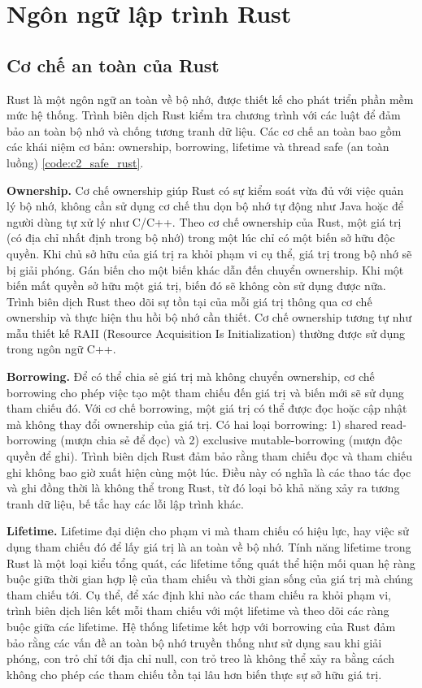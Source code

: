 \section{Ngôn ngữ lập trình Rust}

\subsection{Cơ chế an toàn của Rust}

Rust là một ngôn ngữ an toàn về bộ nhớ, được thiết kế cho phát triển phần mềm mức hệ thống.
Trình biên dịch Rust kiểm tra chương trình với các luật để đảm bảo an toàn bộ nhớ và chống tương tranh dữ liệu.
Các cơ chế an toàn bao gồm các khái niệm cơ bản: ownership, borrowing, lifetime và thread safe (an toàn luồng) \ref{code:c2_safe_rust}.

\textbf{Ownership.} Cơ chế ownership giúp Rust có sự kiểm soát vừa đủ với việc quản lý bộ nhớ, không cần sử dụng cơ chế thu dọn bộ nhớ tự động như Java hoặc để người dùng tự xử lý như C/C++.
Theo cơ chế ownership của Rust, một giá trị (có địa chỉ nhất định trong bộ nhớ) trong một lúc chỉ có một biến sở hữu độc quyền.
Khi chủ sở hữu của giá trị ra khỏi phạm vi cụ thể, giá trị trong bộ nhớ sẽ bị giải phóng.
Gán biến cho một biến khác dẫn đến chuyển ownership.
Khi một biến mất quyền sở hữu một giá trị, biến đó sẽ không còn sử dụng được nữa.
Trình biên dịch Rust theo dõi sự tồn tại của mỗi giá trị thông qua cơ chế ownership và thực hiện thu hồi bộ nhớ cần thiết.
Cơ chế ownership tương tự như mẫu thiết kế RAII (Resource Acquisition Is Initialization) \cite{cppreferenceRAIICppreferencecom} thường được sử dụng trong ngôn ngữ C++.

\textbf{Borrowing.} Để có thể chia sẻ giá trị mà không chuyển ownership, cơ chế borrowing cho phép việc tạo một tham chiếu đến giá trị và biến mới sẽ sử dụng tham chiếu đó.
Với cơ chế borrowing, một giá trị có thể được đọc hoặc cập nhật mà không thay đổi ownership của giá trị.
Có hai loại borrowing: 1) shared read-borrowing (mượn chia sẻ để đọc) và 2) exclusive mutable-borrowing (mượn độc quyền để ghi).
Trình biên dịch Rust đảm bảo rằng tham chiếu đọc và tham chiếu ghi không bao giờ xuất hiện cùng một lúc.
Điều này có nghĩa là các thao tác đọc và ghi đồng thời là không thể trong Rust, từ đó loại bỏ khả năng xảy ra tương tranh dữ liệu, bế tắc hay các lỗi lập trình khác.

\textbf{Lifetime.} Lifetime đại diện cho phạm vi mà tham chiếu có hiệu lực, hay việc sử dụng tham chiếu đó để lấy giá trị là an toàn về bộ nhớ.
Tính năng lifetime trong Rust là một loại kiểu tổng quát, các lifetime tổng quát thể hiện mối quan hệ ràng buộc giữa thời gian hợp lệ của tham chiếu và thời gian sống của giá trị mà chúng tham chiếu tới.
Cụ thể, để xác định khi nào các tham chiếu ra khỏi phạm vi, trình biên dịch liên kết mỗi tham chiếu với một lifetime và theo dõi các ràng buộc giữa các lifetime.
Hệ thống lifetime kết hợp với borrowing của Rust đảm bảo rằng các vấn đề an toàn bộ nhớ truyền thống như sử dụng sau khi giải phóng, con trỏ chỉ tới địa chỉ null, con trỏ treo là không thể xảy ra bằng cách không cho phép các tham chiếu tồn tại lâu hơn biến thực sự sở hữu giá trị.

